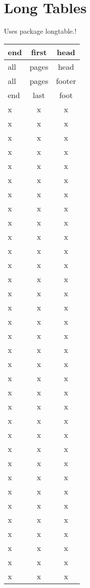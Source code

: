 \documentclass[a4paper,10pt]{scrartcl}
\begin{document}
\section{Long Tables}
Uses package longtable.! \\
\begin{longtable}{|l|cc|} \hline
end & first & head\\ \hline
\endfirsthead

all & pages & head\\ \hline
\endhead

all & pages & footer\\ \hline
\endfoot

end & last & foot\\ \hline
\endlastfoot

x & x & x\\ 
x & x & x\\ 
x & x & x\\ 
x & x & x\\ 
x & x & x\\ 
x & x & x\\ 
x & x & x\\ 
x & x & x\\ 
x & x & x\\ 
x & x & x\\ 
x & x & x\\ 
x & x & x\\ 
x & x & x\\ 
x & x & x\\ 
x & x & x\\ 
x & x & x\\ 
x & x & x\\ 
x & x & x\\ 
x & x & x\\ 
x & x & x\\ 
x & x & x\\ 
x & x & x\\ 
x & x & x\\ 
x & x & x\\ 
x & x & x\\ 
x & x & x\\ 
x & x & x\\ 
x & x & x\\ 
x & x & x\\ 
x & x & x\\ 
x & x & x\\ 
x & x & x\\ 
x & x & x\\ 
x & x & x\\ 

\end{longtable}
\end{document}
